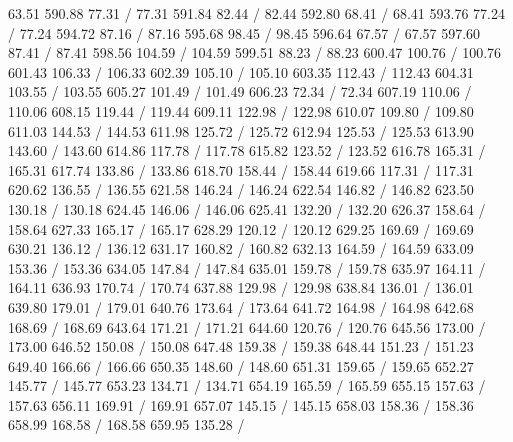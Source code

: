{ 63.51 590.88 77.31 /
 77.31 591.84 82.44 /
 82.44 592.80 68.41 /
 68.41 593.76 77.24 /
 77.24 594.72 87.16 /
 87.16 595.68 98.45 /
 98.45 596.64 67.57 /
 67.57 597.60 87.41 /
 87.41 598.56 104.59 /
 104.59 599.51 88.23 /
 88.23 600.47 100.76 /
 100.76 601.43 106.33 /
 106.33 602.39 105.10 /
 105.10 603.35 112.43 /
 112.43 604.31 103.55 /
 103.55 605.27 101.49 /
 101.49 606.23 72.34 /
 72.34 607.19 110.06 /
 110.06 608.15 119.44 /
 119.44 609.11 122.98 /
 122.98 610.07 109.80 /
 109.80 611.03 144.53 /
 144.53 611.98 125.72 /
 125.72 612.94 125.53 /
 125.53 613.90 143.60 /
 143.60 614.86 117.78 /
 117.78 615.82 123.52 /
 123.52 616.78 165.31 /
 165.31 617.74 133.86 /
 133.86 618.70 158.44 /
 158.44 619.66 117.31 /
 117.31 620.62 136.55 /
 136.55 621.58 146.24 /
 146.24 622.54 146.82 /
 146.82 623.50 130.18 /
 130.18 624.45 146.06 /
 146.06 625.41 132.20 /
 132.20 626.37 158.64 /
 158.64 627.33 165.17 /
 165.17 628.29 120.12 /
 120.12 629.25 169.69 /
 169.69 630.21 136.12 /
 136.12 631.17 160.82 /
 160.82 632.13 164.59 /
 164.59 633.09 153.36 /
 153.36 634.05 147.84 /
 147.84 635.01 159.78 /
 159.78 635.97 164.11 /
 164.11 636.93 170.74 /
 170.74 637.88 129.98 /
 129.98 638.84 136.01 /
 136.01 639.80 179.01 /
 179.01 640.76 173.64 /
 173.64 641.72 164.98 /
 164.98 642.68 168.69 /
 168.69 643.64 171.21 /
 171.21 644.60 120.76 /
 120.76 645.56 173.00 /
 173.00 646.52 150.08 /
 150.08 647.48 159.38 /
 159.38 648.44 151.23 /
 151.23 649.40 166.66 /
 166.66 650.35 148.60 /
 148.60 651.31 159.65 /
 159.65 652.27 145.77 /
 145.77 653.23 134.71 /
 134.71 654.19 165.59 /
 165.59 655.15 157.63 /
 157.63 656.11 169.91 /
 169.91 657.07 145.15 /
 145.15 658.03 158.36 /
 158.36 658.99 168.58 /
 168.58 659.95 135.28 /
}

